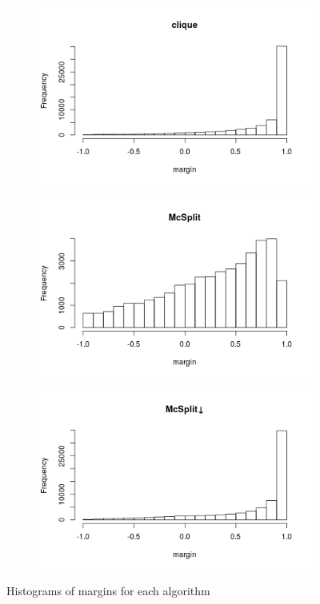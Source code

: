 \documentclass{l4proj}
\theoremstyle{definition}
\theoremstyle{remark}
\begin{document}
\begin{figure}
  \centering
  \begin{subfigure}[t]{0.49\textwidth}
    \centering
    \includegraphics[width=\textwidth]{images/both_labels_clique_hist.png}
  \end{subfigure}
  \begin{subfigure}[t]{0.49\textwidth}
    \centering
    \includegraphics[width=\textwidth]{images/both_labels_mcsplit_hist.png}
  \end{subfigure}
  \begin{subfigure}[t]{0.49\textwidth}
    \centering
    \includegraphics[width=\textwidth]{images/both_labels_mcsplitdown_hist.png}
  \end{subfigure}
  \caption{Histograms of margins for each algorithm}
  \label{fig:both_labels_margin_hist}
\end{figure}
\end{document}
